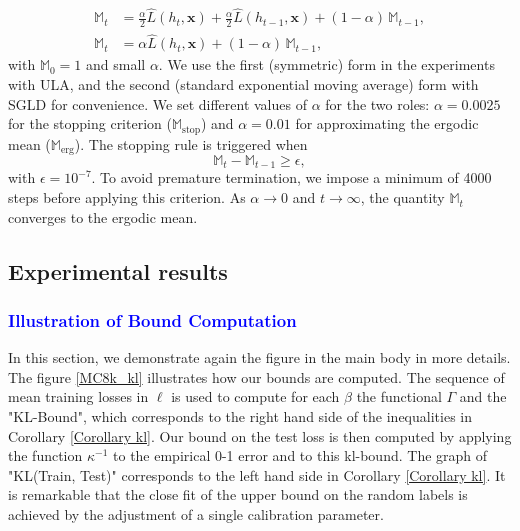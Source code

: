 \documentclass{article} %
\newcommand{\EM}[1]{\textcolor{blue}{#1}}
\begin{document}
\begin{align*}
\mathbb{M}_t &= \tfrac{\alpha}{2} \hat{L}(h_t, \mathbf{x}) 
             + \tfrac{\alpha}{2} \hat{L}(h_{t-1}, \mathbf{x}) 
             + (1-\alpha)\,\mathbb{M}_{t-1}, \\
\mathbb{M}_t &= \alpha \hat{L}(h_t, \mathbf{x}) 
             + (1-\alpha)\,\mathbb{M}_{t-1},
\end{align*}
with $\mathbb{M}_0 = 1$ and small $\alpha$. 
We use the first (symmetric) form in the experiments with ULA, and 
the second (standard exponential moving average) form with SGLD 
for convenience. We set different values of $\alpha$ for the two roles: 
$\alpha = 0.0025$ for the stopping criterion ($\mathbb{M}_{\mathrm{stop}}$) 
and $\alpha = 0.01$ for approximating the ergodic mean ($\mathbb{M}_{\mathrm{erg}}$). 
The stopping rule is triggered when
\[
\mathbb{M}_t - \mathbb{M}_{t-1} \geq \epsilon,
\]
with $\epsilon = 10^{-7}$. 
To avoid premature termination, we impose a minimum of 4000 steps 
before applying this criterion. 
As $\alpha \to 0$ and $t \to \infty$, the quantity 
$\mathbb{M}_t$ converges to the ergodic mean.


\subsection{Experimental results} \label{sec:exp_res}
\subsubsection{\EM{Illustration of Bound Computation}} \label{sec:illustration}
In this section, we demonstrate again the figure in the main body in more details. 
The figure \ref{MC8k_kl} illustrates how our bounds are computed. The sequence of mean
training losses in $\ell $ is used to compute for each $\beta $ the
functional $\Gamma $ and the "KL-Bound", which corresponds to the right hand
side of the inequalities in Corollary \ref{Corollary kl}. Our bound on the test loss is
then computed by applying the function $\kappa ^{-1}$ to the empirical 0-1
error and to this kl-bound. The graph of "KL(Train, Test)" corresponds to the
left hand side in Corollary \ref{Corollary kl}.
\newline
It is remarkable that the close fit of the upper bound on the random labels is achieved by the adjustment of a single calibration parameter.
\end{document}
